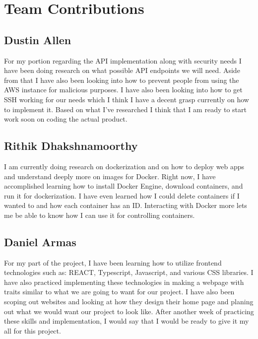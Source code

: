 \documentclass[12pt]{article}
\begin{document}
\section{Team Contributions}
\subsection{Dustin Allen}
For my portion regarding the API implementation along with security needs I have been doing research on what possible API endpoints we will need. Aside from that I have also been looking into how to prevent people from using the AWS instance for malicious purposes. I have also been looking into how to get SSH working for our needs which I think I have a decent grasp currently on how to implement it. Based on what I’ve researched I think that I am ready to start work soon on coding the actual product.

\subsection{Rithik Dhakshnamoorthy}
I am currently doing research on dockerization and on how to deploy web apps and understand deeply more on images for Docker. Right now, I have accomplished learning how to install Docker Engine, download containers, and run it for dockerization. I have even learned how I could delete containers if I wanted to and how each container has an ID. Interacting with Docker more lets me be able to know how I can use it for controlling containers.

\subsection{Daniel Armas}
For my part of the project, I have been learning how to utilize frontend technologies such as: REACT, Typescript, Javascript, and various CSS libraries. I have also practiced implementing these technologies in making a webpage with traits similar to what we are going to want for our project. I have also been scoping out websites and looking at how they design their home page and planing out what we would want our project to look like. After another week of practicing these skills and implementation, I would say that I would be ready to give it my all for this project. 
\end{document}
